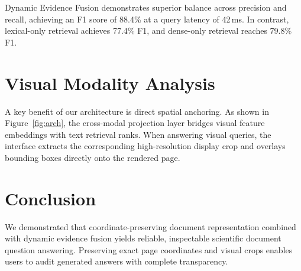 \documentclass[10pt,twocolumn]{article}
\begin{document}
Dynamic Evidence Fusion demonstrates superior balance across precision and recall, achieving an F1 score of 88.4\% at a query latency of 42\,ms. In contrast, lexical-only retrieval achieves 77.4\% F1, and dense-only retrieval reaches 79.8\% F1.

\section{Visual Modality Analysis}
A key benefit of our architecture is direct spatial anchoring. As shown in Figure~\ref{fig:arch}, the cross-modal projection layer bridges visual feature embeddings with text retrieval ranks. When answering visual queries, the interface extracts the corresponding high-resolution display crop and overlays bounding boxes directly onto the rendered page.

\section{Conclusion}
We demonstrated that coordinate-preserving document representation combined with dynamic evidence fusion yields reliable, inspectable scientific document question answering. Preserving exact page coordinates and visual crops enables users to audit generated answers with complete transparency.
\end{document}
